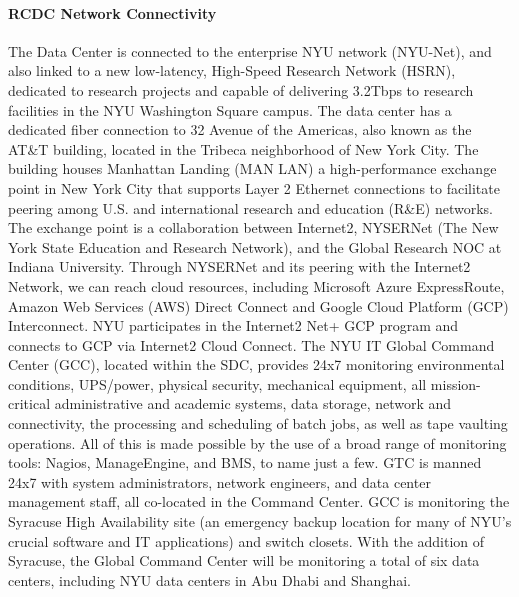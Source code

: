 \paragraph{RCDC Network Connectivity}
The Data Center is connected to the enterprise NYU network (NYU-Net), and also  linked to a new low-latency, High-Speed Research Network (HSRN), dedicated to research projects and capable of delivering 3.2Tbps to research facilities in the NYU Washington Square campus.  The data center has a dedicated fiber connection to 32 Avenue of the Americas, also known as the AT\&T building, located in the Tribeca neighborhood of New York City. The building houses Manhattan Landing (MAN LAN) a high-performance exchange point in New York City that supports Layer 2 Ethernet connections to facilitate peering among U.S. and international research and education (R\&E) networks. The exchange point is a collaboration between Internet2, NYSERNet (The New York State Education and Research Network), and the Global Research NOC at Indiana University. Through NYSERNet and its peering with the Internet2 Network, we can reach cloud resources, including Microsoft Azure ExpressRoute, Amazon Web Services (AWS) Direct Connect and Google Cloud Platform (GCP) Interconnect. NYU participates in the Internet2 Net+ GCP program and connects to GCP via Internet2 Cloud Connect. The NYU IT Global Command Center (GCC), located within the SDC, provides 24x7 monitoring environmental conditions, UPS/power, physical security, mechanical equipment, all mission-critical administrative and academic systems, data storage, network and connectivity, the processing and scheduling of batch jobs, as well as tape vaulting operations. All of this is made possible by the use of a broad range of monitoring tools: Nagios, ManageEngine, and BMS, to name just a few. GTC is manned 24x7 with system administrators, network engineers, and data center management staff, all co-located in the Command Center. GCC is monitoring the Syracuse High Availability site (an emergency backup location for many of NYU’s crucial software and IT applications) and switch closets. With the addition of Syracuse, the Global Command Center will be monitoring a total of six data centers, including NYU data centers in Abu Dhabi and Shanghai.

